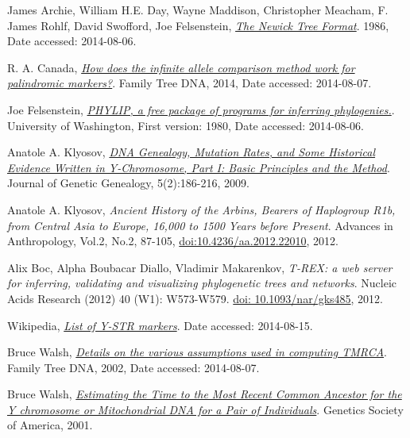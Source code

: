 \raggedright
\begin{thebibliography}{bla}


 James Archie, William H.E. Day, Wayne Maddison,
Christopher Meacham, F. James Rohlf, David Swofford, Joe Felsenstein,
\emph{\href{http://evolution.genetics.washington.edu/phylip/newicktree.html}
{The Newick Tree Format}}.
1986, Date accessed: 2014-08-06.

 R. A. Canada,
\emph{\href{https://www.familytreedna.com/learn/y-dna-testing/y-str/infinite-allele-palindromic-markers/}
{How does the infinite allele comparison method work for palindromic markers?}}.
Family Tree DNA, 2014, Date accessed: 2014-08-07.

 Joe Felsenstein,
\emph{\href{http://evolution.genetics.washington.edu/phylip.html}
{PHYLIP, a free package of programs for inferring phylogenies.}}.
University of Washington, First version: 1980, Date accessed: 2014-08-06.

 Anatole A. Klyosov,
\emph{\href{http://www.jogg.info/52/files/Klyosov1.pdf}
{DNA Genealogy, Mutation Rates, and Some Historical
Evidence Written in Y-Chromosome, Part I:  Basic Principles and
the Method}}.
Journal of Genetic Genealogy, 5(2):186-216, 2009.

 Anatole A. Klyosov,
\emph{Ancient History of the Arbins, Bearers of Haplogroup R1b, from
Central Asia to Europe, 16,000 to 1500 Years before Present}.
Advances in Anthropology, Vol.2, No.2, 87-105,
\href{http://dx.doi.org/10.4236/aa.2012.22010}{doi:10.4236/aa.2012.22010}, 2012.

 Alix Boc, Alpha Boubacar Diallo, Vladimir Makarenkov,
\emph{T-REX: a web server for inferring, validating and
visualizing phylogenetic trees and networks}.
Nucleic Acids Research (2012) 40 (W1): W573-W579.
\href{http://dx.doi.org/10.1093/nar/gks485}{doi: 10.1093/nar/gks485}, 2012. 

 Wikipedia,
\emph{\href{http://en.wikipedia.org/wiki/List_of_DYS_markers}
{List of Y-STR markers}}.
Date accessed: 2014-08-15.

 Bruce Walsh,
\emph{\href{http://nitro.biosci.arizona.edu/ftDNA/models.html}
{Details on the various assumptions used in computing TMRCA}}.
Family Tree DNA, 2002, Date accessed: 2014-08-07.

 Bruce Walsh,
\emph{\href{http://www.ncbi.nlm.nih.gov/pmc/articles/PMC1461668/}
{Estimating the Time to the Most Recent Common Ancestor for the
Y chromosome or Mitochondrial DNA for a Pair of Individuals}}.
Genetics Society of America, 2001.

\end{thebibliography}
